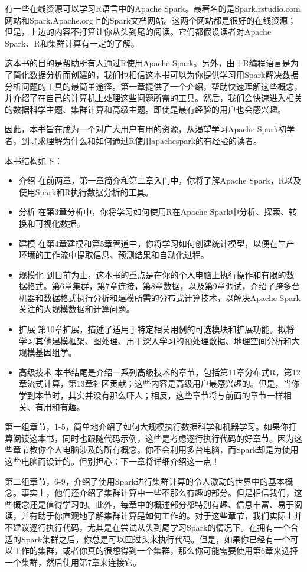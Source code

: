 \documentclass[
]{article}
\providecommand{\tightlist}{%
  \setlength{\itemsep}{0pt}\setlength{\parskip}{0pt}}
\begin{document}
有一些在线资源可以学习R语言中的Apache
Spark。最著名的是Spark.rstudio.com网站和Spark.Apache.org上的Spark文档网站。这两个网站都是很好的在线资源；但是，上边的内容不打算让你从头到尾的阅读。它们都假设读者对Apache
Spark、R和集群计算有一定的了解。

这本书的目的是帮助所有人通过R使用Apache
Spark。另外，由于R编程语言是为了简化数据分析而创建的，我们也相信这本书可以为你提供学习用Spark解决数据分析问题的工具的最简单途径。第一章提供了一个介绍，帮助快速理解这些概念，并介绍了在自己的计算机上处理这些问题所需的工具。然后，我们会快速进入相关的数据科学主题、集群计算和高级主题。即使是最有经验的用户也会感兴趣。

因此，本书旨在成为一个对广大用户有用的资源，从渴望学习Apache
Spark初学者，到寻求理解为什么和如何通过R使用apachespark的有经验的读者。

本书结构如下：

\begin{itemize}
\tightlist
\item
  介绍 在前两章，第一章简介和第二章入门中，你将了解Apache
  Spark，R以及使用Spark和R执行数据分析的工具。
\item
  分析 在第3章分析中，你将学习如何使用R在Apache
  Spark中分析、探索、转换和可视化数据。
\item
  建模
  在第4章建模和第5章管道中，你将学习如何创建统计模型，以便在生产环境的工作流中提取信息、预测结果和自动化过程。
\item
  规模化
  到目前为止，这本书的重点是在你的个人电脑上执行操作和有限的数据格式。第6章集群，第7章连接，第8章数据，以及第9章调试，介绍了跨多台机器和数据格式执行分析和建模所需的分布式计算技术，以解决Apache
  Spark关注的大规模数据和计算问题。
\item
  扩展
  第10章扩展，描述了适用于特定相关用例的可选模块和扩展功能。拟将学习其他建模框架、图处理、用于深入学习的预处理数据、地理空间分析和大规模基因组学。
\item
  高级技术
  本书结尾是介绍一系列高级技术的章节，包括第11章分布式R，第12章流式计算，第13章社区贡献；这些内容是高级用户最感兴趣的。但是，当你学到本节时，其实并没有那么吓人；相反，这些章节将与前面的章节一样相关、有用和有趣。
\end{itemize}

第一组章节，1-5，简单地介绍了如何大规模执行数据科学和机器学习。如果你打算阅读这本书，同时也跟随代码示例，这些是考虑逐行执行代码的好章节。因为这些章节教你个人电脑涉及的所有概念。你不会利用多台电脑，而Spark却是为使用这些电脑而设计的。但别担心：下一章将详细介绍这一点！

第二组章节，6-9，介绍了使用Spark进行集群计算的令人激动的世界中的基本概念。事实上，他们还介绍了集群计算中一些不那么有趣的部分。但是相信我们，这些概念还是值得学习的。此外，每章中的概述部分都特别有趣、信息丰富、易于阅读，并有助于你直观地了解集群计算是如何工作的。对于这些章节，我们实际上并不建议逐行执行代码，尤其是在尝试从头到尾学习Spark的情况下。在拥有一个合适的Spark集群之后，你总是可以回过头来执行代码。但是，如果你已经有一个可以工作的集群，或者你真的很想得到一个集群，那么你可能需要使用第6章来选择一个集群，然后使用第7章来连接它。
\end{document}
